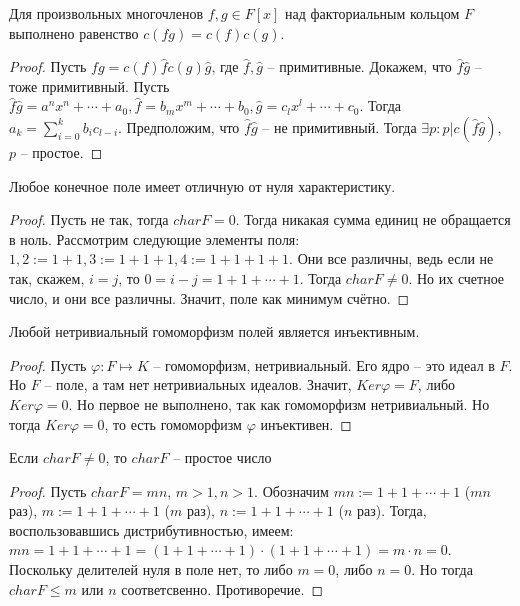 \documentclass{article}
\begin{document}
\begin{statement}
    Для произвольных многочленов $f, g \in F[x]$ над факториальным кольцом $F$ выполнено равенство $c(fg) = c(f)c(g)$.
\end{statement}

\begin{proof}
    Пусть $fg = c(f) \hat f c(g) \hat g$, где $\hat f, \hat g$ -- примитивные. Докажем, что $\hat f \hat g$ -- тоже
    примитивный. Пусть $\hat f \hat g = a^n x^n + \cdots + a_0, \hat f = b_m x^m + \cdots + b_0, \hat g = c_l x^l +
    \cdots + c_0$. Тогда $a_k = \sum_{i = 0}^k b_i c_{l - i}$. Предположим, что $\hat f \hat g$ -- не примитивный. Тогда
    $\exists p: p | c(\hat f \hat g)$, $p$ -- простое.
\end{proof}

\begin{statement}
    Любое конечное поле имеет отличную от нуля характеристику.
\end{statement}

\begin{proof}
    Пусть не так, тогда $char F = 0$. Тогда никакая сумма единиц не обращается в ноль. Рассмотрим следующие элементы
    поля: $1, 2 := 1 + 1, 3 := 1 + 1 + 1, 4 := 1 + 1 + 1 + 1$. Они все различны, ведь если не так, скажем, $i = j$, то
    $0 = i - j = 1 + 1 + \cdots + 1$. Тогда $char F \neq 0$. Но их счетное число, и они все различны. Значит, поле как
    минимум счётно.
\end{proof}

\begin{statement}
    Любой нетривиальный гомоморфизм полей является инъективным.
\end{statement}

\begin{proof}
    Пусть $\varphi: F \mapsto K$ -- гомоморфизм, нетривиальный. Его ядро -- это идеал в $F$. Но $F$ -- поле, а там нет
    нетривиальных идеалов. Значит, $Ker \varphi = F$, либо $Ker \varphi = 0$. Но первое не выполнено, так как
    гомоморфизм нетривиальный. Но тогда $Ker \varphi = 0$, то есть гомоморфизм $\varphi$ инъективен.
\end{proof}

\begin{statement}
    Если $char F \neq 0$, то $char F$ -- простое число
\end{statement}

\begin{proof}
    Пусть $char F = mn$, $m > 1, n > 1$.
    Обозначим $mn := 1 + 1 + \cdots + 1$ ($mn$ раз), $m := 1 + 1 + \cdots + 1$ ($m$ раз), $n := 1 +
    1 + \cdots + 1$ ($n$ раз). Тогда, воспользовавшись дистрибутивностью, имеем: $mn = 1 + 1 + \cdots + 1 = (1 + 1 +
    \cdots + 1) \cdot (1 + 1 + \cdots + 1) = m \cdot n = 0$. Поскольку делителей нуля в поле нет, то либо $m = 0$, либо
    $n = 0$. Но тогда $char F \leq m$ или $n$ соответсвенно. Противоречие.
\end{proof}
\end{document}
